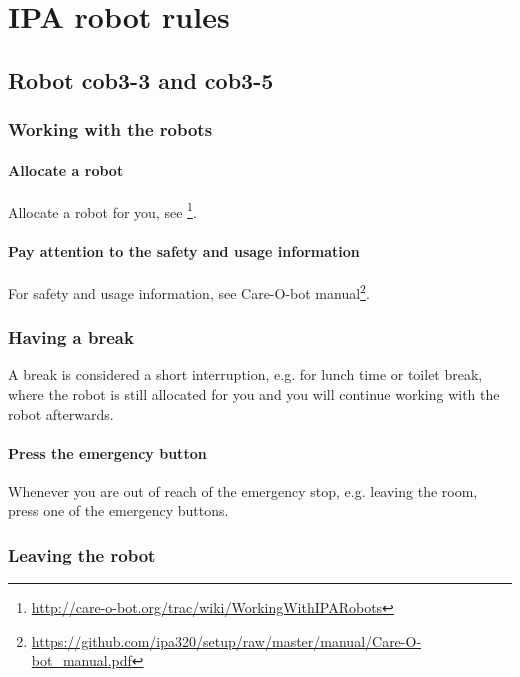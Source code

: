 \chapter{IPA robot rules}\label{chap:robot-rules}


\section{Robot cob3-3 and cob3-5}

\subsection{Working with the robots}

\subsubsection{Allocate a robot}
Allocate a robot for you, see \footnote{\url{http://care-o-bot.org/trac/wiki/WorkingWithIPARobots}}. 

\subsubsection{Pay attention to the safety and usage information}
For safety and usage information, see Care-O-bot manual\footnote{\url{https://github.com/ipa320/setup/raw/master/manual/Care-O-bot_manual.pdf}}.

\subsection{Having a break}
A break is considered a short interruption, e.g. for lunch time or toilet break, where the robot is still allocated for you and you will continue working with the robot afterwards.

\subsubsection{Press the emergency button}
Whenever you are out of reach of the emergency stop, e.g. leaving the room, press one of the emergency buttons.

\subsection{Leaving the robot}

